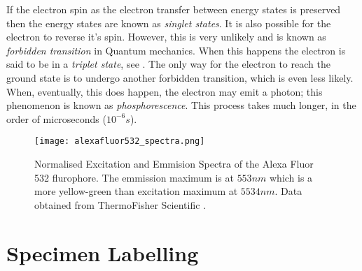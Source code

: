 

\begin{definition}
	If the electron spin as the electron transfer between energy states is preserved then the energy states are known as \textit{singlet states}.
	It is also possible for the electron to reverse it's spin.
	However, this is very unlikely and is known as \textit{forbidden transition} in Quantum mechanics.
	When this happens the electron is said to be in a \textit{triplet state}, see .
	The only way for the electron to reach the ground state is to undergo another forbidden transition, which is even less likely.
	When, eventually, this does happen, the electron may emit a photon; this phenomenon is known as \textit{phosphorescence}.
	This process takes much longer, in the order of microseconds ($10^{-6}s$).
\end{definition}


\begin{figure}[!t]
	\centering
	\texttt{[image: alexafluor532\_spectra.png]}
	\caption{Normalised Excitation and Emmision Spectra of the Alexa Fluor 532 flurophore.
	The emmission maximum is at $553nm$ which is a more yellow-green than excitation maximum at $5534nm$.
	Data obtained from ThermoFisher Scientific \citep{AlexaFluor532}.}
	\label{fig:excitationandemissionspectra}
\end{figure}


\section{Specimen Labelling}
\label{sec:SpecimenLabelling}

